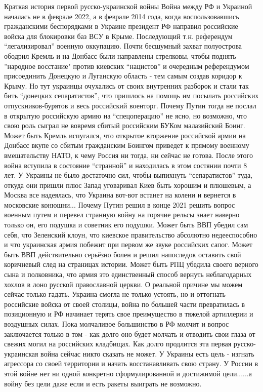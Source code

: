  
 
 
 
 

Краткая история первой русско-украинской войны
Война между РФ и Украиной началась не в феврале 2022, а в феврале
2014 года, когда воспользовавшись гражданскими беспорядками в Украине
президент РФ направил российские войска для блокировки баз ВСУ в Крыме.
Последующий т.н. референдум “легализировал” военную оккупацию.
Почти бесшумный захват полуострова ободрил Кремль и на Донбасс были
направлены стрелковы, чтобы поднять ”народное восстание" против
киевских “нацистов” и очередным референдумом присоединить Донецкую и
Луганскую область - тем самым создав коридор к Крыму.
Но тут украинцы очухались от своих внутренних разборок и стали так
бить “донецких сепаратистов”, что пришлось на помощь им посылать
российских отпускников-бурятов и весь российский военторг.
Почему Путин тогда не послал в открытую российскую армию на
“спецоперацию” не ясно, но возможно, что свою роль сыграл не вовремя
сбитый российским БУКом малазийский Боинг.
Может быть Кремль испугался, что открытое вторжение российской
армии на Донбасс вкупе со сбитым гражданским Боингом приведет к прямому
военному вмешательству НАТО, к чему Россия ни тогда, ни сейчас не
готова.
После этого война вступила в состояние “странной” и находилась в
этом состянии почти 8 лет.
У Украины не было достаточно сил, чтобы выпихнуть “сепаратистов”
туда, откуда они пришли плюс Запад уговаривал Киев быть хорошим и
плюшевым, а Москва все надеялась, что Украина вот-вот встанет на колени и
вернется в московские конюшни...
Почему Путин решил в конце 2021 решить вопрос военным путем и
перевел странную войну на горячие рельсы знает наверно только он, его
подушка и советник его подушки.
Может быть ВВП убедил сам себя, что Зеленский клоун, что киевское
правительство абсолютно недееспособно и что украинская армия побежит при
первом же звуке российских сапог.
Может быть ВВП действительно серьёзно болен и решил напоследок
оставить свой коричневый след на страницах истории.
Может быть РПЦ убедила своего верного сына и полковника, что армия
это единственный способ вернуть неблагодарных хохлов в лоно русской
православной церкви.
О реальной причине мы можем сейчас только гадать.
Украина смогла не только устоять, но и оттогнать российские войска
от своей столицы, война по большей части превратилась в позиционную и
РФ начинает терять свое преимущество в тяжелой артиллерии и воздушных
силах.
Пока молчаливое большинство в РФ молчит и вопрос заключается
только в том - как долго оно будет молчать и отводить свои глаза от
свежих могил на российских кладбищах.
Как долго продлится эта первая русско-украинская война сейчас
никто сказать не может.
У Украины есть цель - изгнать агрессора со своей территории и
начать восстанавливать свою страну.
У России в этой войне нет ни одной конкретно сформулированной и
достижимой цели......а войну без цели даже если и есть ракеты выиграть
не возможно.

